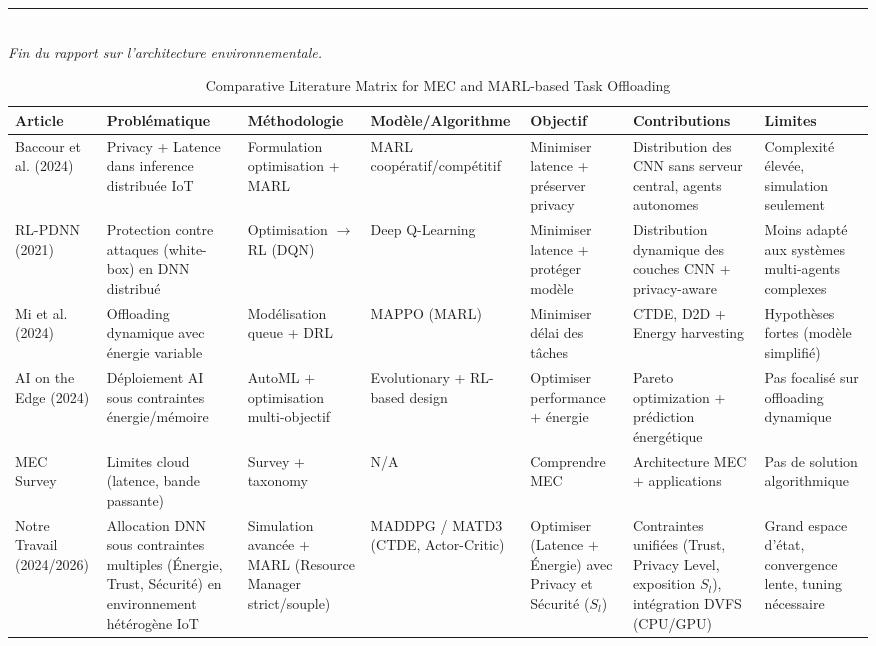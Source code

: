 \documentclass[12pt,a4paper]{article}
\begin{document}
\vspace{1cm}
\begin{center}
    \rule{0.5\textwidth}{0.4pt} \\
    \vspace{0.2cm}
    \textit{Fin du rapport sur l'architecture environnementale.}
\end{center}


\begin{table}[ht]
\centering
\small
\renewcommand{\arraystretch}{1.3}

\begin{tabularx}{\textwidth}{|p{2.2cm}|X|X|X|X|X|X|}
\hline
\textbf{Article} & \textbf{Problématique} & \textbf{Méthodologie} & \textbf{Modèle/Algorithme} & \textbf{Objectif} & \textbf{Contributions} & \textbf{Limites} \\
\hline

Baccour et al. (2024) &
Privacy + Latence dans inference distribuée IoT &
Formulation optimisation + MARL &
MARL coopératif/compétitif &
Minimiser latence + préserver privacy &
Distribution des CNN sans serveur central, agents autonomes &
Complexité élevée, simulation seulement \\
\hline

RL-PDNN (2021) &
Protection contre attaques (white-box) en DNN distribué &
Optimisation $\rightarrow$ RL (DQN) &
Deep Q-Learning &
Minimiser latence + protéger modèle &
Distribution dynamique des couches CNN + privacy-aware &
Moins adapté aux systèmes multi-agents complexes \\
\hline

Mi et al. (2024) &
Offloading dynamique avec énergie variable &
Modélisation queue + DRL &
MAPPO (MARL) &
Minimiser délai des tâches &
CTDE, D2D + Energy harvesting &
Hypothèses fortes (modèle simplifié) \\
\hline

AI on the Edge (2024) &
Déploiement AI sous contraintes énergie/mémoire &
AutoML + optimisation multi-objectif &
Evolutionary + RL-based design &
Optimiser performance + énergie &
Pareto optimization + prédiction énergétique &
Pas focalisé sur offloading dynamique \\
\hline

MEC Survey &
Limites cloud (latence, bande passante) &
Survey + taxonomy &
N/A &
Comprendre MEC &
Architecture MEC + applications &
Pas de solution algorithmique \\
\hline

Notre Travail (2024/2026) &
Allocation DNN sous contraintes multiples (Énergie, Trust, Sécurité) en environnement hétérogène IoT &
Simulation avancée + MARL (Resource Manager strict/souple) &
MADDPG / MATD3 (CTDE, Actor-Critic) &
Optimiser (Latence + Énergie) avec Privacy et Sécurité ($S_l$) &
Contraintes unifiées (Trust, Privacy Level, exposition $S_l$), intégration DVFS (CPU/GPU) &
Grand espace d'état, convergence lente, tuning nécessaire \\
\hline

\end{tabularx}

\caption{Comparative Literature Matrix for MEC and MARL-based Task Offloading}
\label{tab:literature_matrix}

\end{table}
\end{document}

